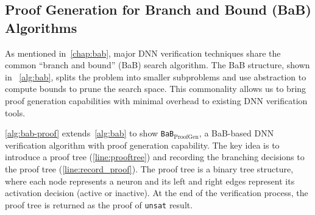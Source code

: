\documentclass[oneside,11pt,dvipsnames]{book}
\numberwithin{equation}{section}
\theoremstyle{definition}
\theoremstyle{remark}
\newcommand{\proofgen}{\texttt{BaB$_{\text{ProofGen}}$}}
\newcommand{\neuralsat}{\texttt{NeuralSAT}}
\newcommand{\unsat}{\texttt{unsat}}
\begin{document}





\subsection{Proof Generation for Branch and Bound (BaB) Algorithms}\label{sec:proogen}

As mentioned in~\autoref{chap:bab}, major DNN verification techniques share the common ``branch and bound'' (BaB) search algorithm. The BaB structure, shown in~ \autoref{alg:bab}, splits the problem into smaller subproblems and use abstraction to compute bounds to prune the search space. This commonality allows us to bring proof generation capabilities with minimal overhead to existing DNN verification tools.

\autoref{alg:bab-proof} extends~\autoref{alg:bab} to show \proofgen, a BaB-based DNN verification algorithm with proof generation capability. The key idea is to introduce a proof tree (\autoref{line:prooftree}) and recording the branching decisions to the proof tree (\autoref{line:record_proof}).
The proof tree is a binary tree structure, where each node represents a neuron and its left and right edges represent its activation decision (active or inactive).
At the end of the verification process, the proof tree is returned as the proof of \unsat{} result.
\end{document}
